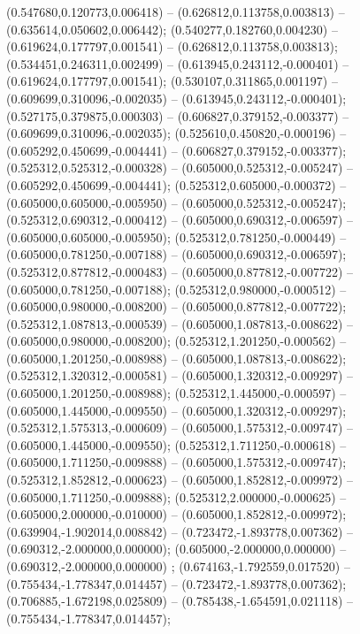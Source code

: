  (0.547680,0.120773,0.006418) -- (0.626812,0.113758,0.003813) -- (0.635614,0.050602,0.006442);
 (0.540277,0.182760,0.004230) -- (0.619624,0.177797,0.001541) -- (0.626812,0.113758,0.003813);
 (0.534451,0.246311,0.002499) -- (0.613945,0.243112,-0.000401) -- (0.619624,0.177797,0.001541);
 (0.530107,0.311865,0.001197) -- (0.609699,0.310096,-0.002035) -- (0.613945,0.243112,-0.000401);
 (0.527175,0.379875,0.000303) -- (0.606827,0.379152,-0.003377) -- (0.609699,0.310096,-0.002035);
 (0.525610,0.450820,-0.000196) -- (0.605292,0.450699,-0.004441) -- (0.606827,0.379152,-0.003377);
 (0.525312,0.525312,-0.000328) -- (0.605000,0.525312,-0.005247) -- (0.605292,0.450699,-0.004441);
 (0.525312,0.605000,-0.000372) -- (0.605000,0.605000,-0.005950) -- (0.605000,0.525312,-0.005247);
 (0.525312,0.690312,-0.000412) -- (0.605000,0.690312,-0.006597) -- (0.605000,0.605000,-0.005950);
 (0.525312,0.781250,-0.000449) -- (0.605000,0.781250,-0.007188) -- (0.605000,0.690312,-0.006597);
 (0.525312,0.877812,-0.000483) -- (0.605000,0.877812,-0.007722) -- (0.605000,0.781250,-0.007188);
 (0.525312,0.980000,-0.000512) -- (0.605000,0.980000,-0.008200) -- (0.605000,0.877812,-0.007722);
 (0.525312,1.087813,-0.000539) -- (0.605000,1.087813,-0.008622) -- (0.605000,0.980000,-0.008200);
 (0.525312,1.201250,-0.000562) -- (0.605000,1.201250,-0.008988) -- (0.605000,1.087813,-0.008622);
 (0.525312,1.320312,-0.000581) -- (0.605000,1.320312,-0.009297) -- (0.605000,1.201250,-0.008988);
 (0.525312,1.445000,-0.000597) -- (0.605000,1.445000,-0.009550) -- (0.605000,1.320312,-0.009297);
 (0.525312,1.575313,-0.000609) -- (0.605000,1.575312,-0.009747) -- (0.605000,1.445000,-0.009550);
 (0.525312,1.711250,-0.000618) -- (0.605000,1.711250,-0.009888) -- (0.605000,1.575312,-0.009747);
 (0.525312,1.852812,-0.000623) -- (0.605000,1.852812,-0.009972) -- (0.605000,1.711250,-0.009888);
 (0.525312,2.000000,-0.000625) -- (0.605000,2.000000,-0.010000) -- (0.605000,1.852812,-0.009972);
 (0.639904,-1.902014,0.008842) -- (0.723472,-1.893778,0.007362) -- (0.690312,-2.000000,0.000000);
 (0.605000,-2.000000,0.000000) -- (0.690312,-2.000000,0.000000) ;
 (0.674163,-1.792559,0.017520) -- (0.755434,-1.778347,0.014457) -- (0.723472,-1.893778,0.007362);
 (0.706885,-1.672198,0.025809) -- (0.785438,-1.654591,0.021118) -- (0.755434,-1.778347,0.014457);
